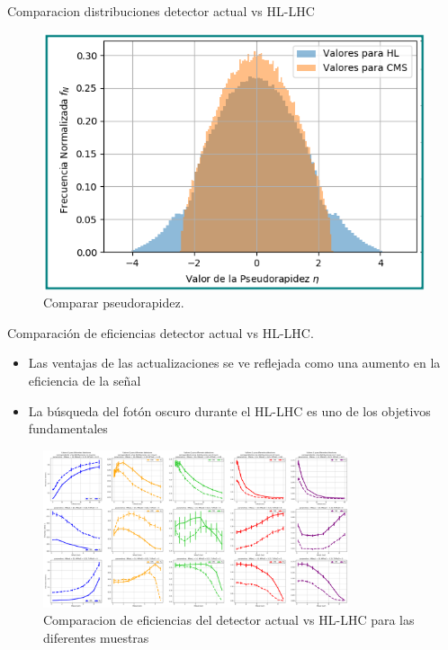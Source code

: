 \begin{frame}{Comparacion distribuciones detector actual vs HL-LHC}
\begin{figure}
    \centering
    \includegraphics[width=1\textwidth]{Imag/Datos_Eta_ALL_simple.png}
    \caption{Comparar pseudorapidez.}
    \label{fig:my_label}
\end{figure}  
\end{frame}

\begin{frame}{Comparación de eficiencias detector actual vs HL-LHC.}
    
    \begin{itemize}
        \item Las ventajas de las actualizaciones se ve reflejada como una aumento en la eficiencia de la se\~nal
        \item La b\'usqueda del fot\'on oscuro durante el HL-LHC es uno de los objetivos fundamentales
    \end{itemize}
    
\begin{figure}[h]
\centering
\includegraphics[width=0.8\textwidth]{Imag/Comparacion_Distribucion_Entries.png}
\caption{Comparacion de eficiencias del detector actual vs HL-LHC para las diferentes muestras}
\end{figure}

\end{frame}

